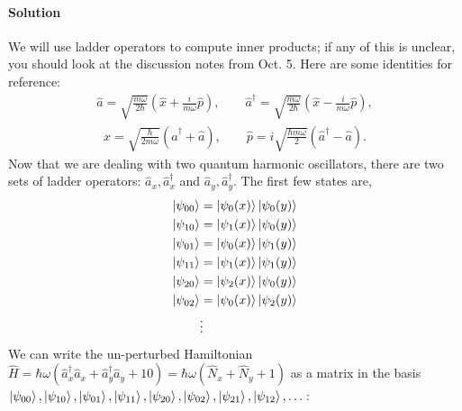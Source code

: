 \documentclass[10pt]{article}
\newcommand{\1}{\mathbf 1}
\begin{document}
\paragraph{Solution}


We will use ladder operators to compute inner products; if any of this is unclear, you should look at the discussion notes from Oct. 5.
Here are some identities for reference:
\begin{align}
	\hat a
	=
	\sqrt{\frac{m \omega}{2 \hbar}} ( \hat x + \frac{i}{m\omega}\hat p),
	\qquad
	\hat a^\dagger
	=
	\sqrt{\frac{m \omega}{2 \hbar}} ( \hat x - \frac{i}{m\omega}\hat p),
\end{align}
\begin{align}
	\hat x = \sqrt{
		\frac{\hbar}{2m \omega}
	}
	(\hat a^\dagger +\hat a),
	\qquad
	\hat p =i \sqrt{
		\frac{\hbar m \omega}{2}
	}
	(\hat a^\dagger - \hat a).
\end{align}
Now that we are dealing with two quantum harmonic oscillators, there are two sets of ladder operators: $\hat a_x, \hat a_x^\dagger$ and $\hat a_y, \hat a_y^\dagger$.
The first few states are,
\begin{align}
	\ket{\psi_{00}}
	&=
	\ket{\psi_0(x)}
	\ket{\psi_0(y)}
	\\
	\ket{\psi_{10}}
	&=
	\ket{\psi_1(x)}
	\ket{\psi_0(y)}
	\\
	\ket{\psi_{01}}
	&=
	\ket{\psi_0(x)}
	\ket{\psi_1(y)}
	\\
	\ket{\psi_{11}}
	&=
	\ket{\psi_1(x)}
	\ket{\psi_1(y)}
	\\
	\ket{\psi_{20}}
	&=
	\ket{\psi_2(x)}
	\ket{\psi_0(y)}
	\\
	\ket{\psi_{02}}
	&=
	\ket{\psi_0(x)}
	\ket{\psi_2(y)}
	\\
&\vdots
\end{align}
We can write the un-perturbed Hamiltonian $\hat H = \hbar \omega (\hat a_x^\dagger \hat a_x +\hat a_y^\dagger \hat a_y + 10) = \hbar \omega (\hat N_x + \hat N_y + 1)$ as a matrix in the basis $\ket{\psi_{00}}, \ket{\psi_{10}},\ket{\psi_{01}},\ket{\psi_{11}},\ket{\psi_{20}},\ket{\psi_{02}},\ket{\psi_{21}},\ket{\psi_{12}},\dots$:
\end{document}
